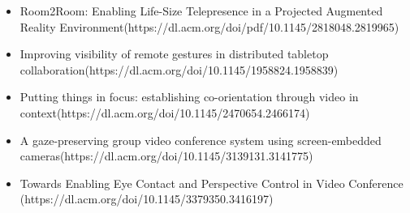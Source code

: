 \begin{itemize}
  \item Room2Room: Enabling Life-Size Telepresence in a Projected Augmented Reality Environment(https://dl.acm.org/doi/pdf/10.1145/2818048.2819965)
  \item Improving visibility of remote gestures in distributed tabletop collaboration(https://dl.acm.org/doi/10.1145/1958824.1958839)
  \item Putting things in focus: establishing co-orientation through video in context(https://dl.acm.org/doi/10.1145/2470654.2466174)
  \item A gaze-preserving group video conference system using screen-embedded cameras(https://dl.acm.org/doi/10.1145/3139131.3141775)
  \item Towards Enabling Eye Contact and Perspective Control in Video Conference (https://dl.acm.org/doi/10.1145/3379350.3416197)
\end{itemize}